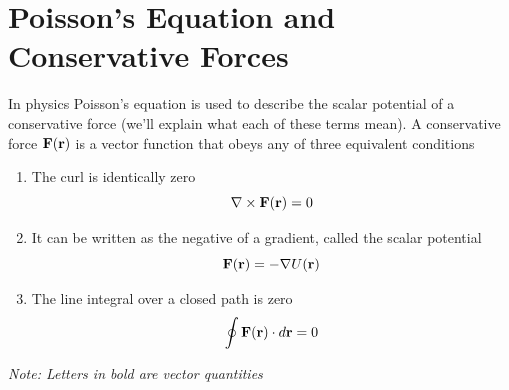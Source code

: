 \section*{Poisson's Equation and Conservative Forces}
In physics Poisson's equation is used to describe the scalar potential of a conservative force (we'll explain what each of these terms mean).
A conservative force $\bold{F}(\bold{r})$ is a vector function that obeys any of three equivalent conditions
\begin{enumerate}
	\item The curl is identically zero
		\[\nabla \times \bold{F}(\bold{r}) = 0\]
	\item It can be written as the negative of a gradient, called the scalar potential
		\[\bold{F}(\bold{r}) = - \nabla U(\bold{r})\]
	\item The line integral over a closed path is zero
		\[\oint \bold{F}(\bold{r}) \cdot d\bold{r} = 0\]

\end{enumerate}
\textit{Note: Letters in bold are vector quantities}

